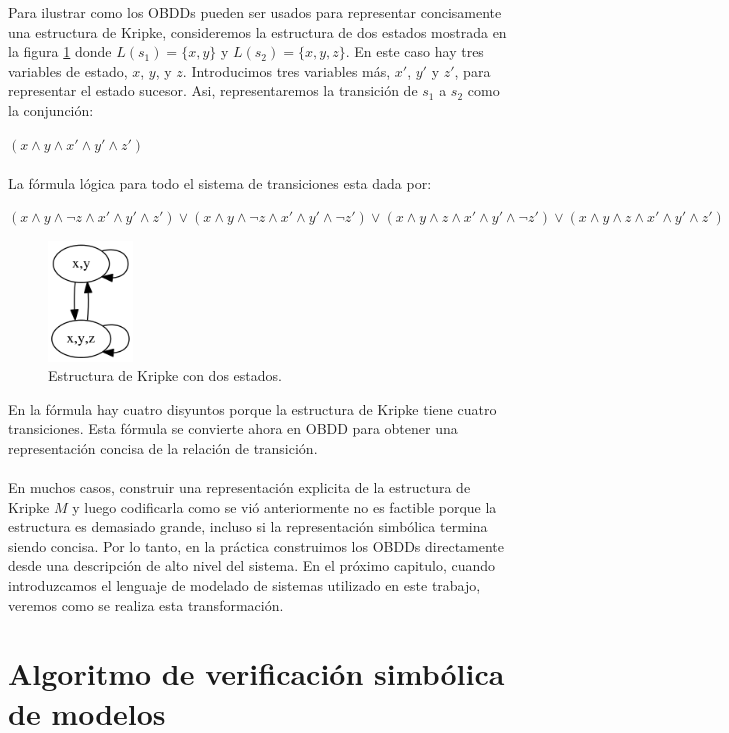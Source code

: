 Para ilustrar como los OBDDs pueden ser usados para representar concisamente una estructura de Kripke, consideremos la estructura de dos estados mostrada en la figura \ref{fig:kripke2} donde $L(s_{1}) = \{x,y\}$ y $L(s_{2}) = \{x,y,z\}$. En este caso hay tres variables de estado, $x$, $y$, y $z$. Introducimos tres variables más, $x'$, $y'$ y $z'$, para representar el estado sucesor. Asi, representaremos la transición de $s_{1}$ a $s_{2}$ como la conjunción:

$(x \land y \land x' \land y' \land z')$\\
\\
La fórmula lógica para todo el sistema de transiciones esta dada por:

$(x \land y \land \neg z \land x' \land y' \land z') \lor (x \land y \land \neg z \land x' \land y' \land \neg z') \lor (x \land y \land z \land x' \land y' \land \neg z') \lor (x \land y \land z \land x' \land y' \land z')$ 
\begin{figure}[H]
  \centering
  \includegraphics[width=0.2\textwidth]{Figures/kripke2.png}
  \caption{Estructura de Kripke con dos estados.}
  \label{fig:kripke2}
\end{figure}

\noindent En la fórmula hay cuatro disyuntos porque la estructura de Kripke tiene cuatro transiciones. Esta fórmula se convierte ahora en OBDD para obtener una representación concisa de la relación de transición.\\
\\
En muchos casos, construir una representación explicita de la estructura de Kripke $M$ y luego codificarla como se vió anteriormente no es factible porque la estructura es demasiado grande, incluso si la representación simbólica termina siendo concisa. Por lo tanto, en la práctica construimos los OBDDs directamente desde una descripción de alto nivel del sistema. En el próximo capitulo, cuando introduzcamos el lenguaje de modelado de sistemas utilizado en este trabajo, veremos como se realiza esta transformación.

\section{Algoritmo de verificación simbólica de modelos}

